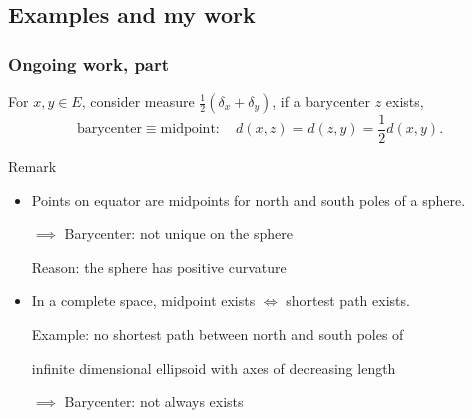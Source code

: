 \documentclass[aspectratio=169]{beamer}
\begin{document}
\subsection{Examples and my work}
\begin{frame}
	\frametitle{Ongoing work, part }
	\begin{example}
		For $x,y \in E$, consider measure $\frac{1}{2}(\delta_x + \delta_y)$, if a barycenter $z$ exists,
		\[
			\text{barycenter} \equiv \text{midpoint}:\quad d(x, z) = d(z, y) = \frac{1}{2} d(x,y).
		\]
	\end{example}
	\pause
	\begin{block}{Remark}
		\begin{itemize}
			\item Points on equator are midpoints for north and south poles of a sphere. \pause

			      $\implies$ Barycenter: \alert{not unique} on the sphere \pause

			      \hspace{3.6em} Reason: the sphere has positive curvature  \pause


			\item In a complete space, midpoint exists $\iff$ shortest path exists.\pause

			      Example: no shortest path between north and south poles of

			      infinite dimensional ellipsoid with axes of decreasing length \pause

			      $\implies$ Barycenter: \alert{not always exists}
		\end{itemize}
	\end{block}
\end{frame}
\end{document}
